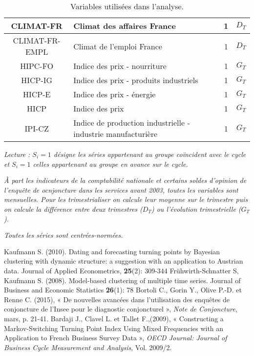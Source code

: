 \documentclass[10pt,french,french]{article}
\begin{document}
\begin{table}[h]
{\begin{tabular}{ | c | p{10cm} | c|c|}
     CLIMAT-FR & Climat des affaires France & 1 & $D_T$\\ \hline
     CLIMAT-FR-EMPL & Climat de l'emploi France  & 1 & $D_T$\\ \hline
     HIPC-FO & Indice des prix - nourriture & 1 & $G_T$\\ \hline
     HICP-IG & Indice des prix - produits industriels & 1 & $G_T$\\ \hline
     HICP-E & Indice des prix - énergie & 1 & $G_T$\\ \hline
     HICP & Indice des prix & 1 & $G_T$\\ \hline
     IPI-CZ & Indice de production industrielle - industrie manufacturière & 1& $G_T$ \\
     \hline
   \end{tabular}
   \caption{Variables utilisées dans l'analyse.}\label{tableau_var}}
  \footnotesize
\emph{Lecture : $S_i=1$ désigne les séries appartenant au groupe coïncident avec le cycle et $S_i=1$ celles appartenant au groupe en avance sur le cycle.}

\emph{À part les indicateurs de la comptabilité nationale et certains soldes d'opinion de l'enquête de ocnjoncture dans les services avant 2003, toutes les variables sont mensuelles. Pour les trimestrialiser on calcule leur moyenne sur le trimestre puis on calcule la différence entre deux trimestres ($D_T$) ou l'évolution trimestrielle ($G_T$).}

\emph{Toutes les séries sont centrées-normées.}
\end{table}

\newpage

\nocite{*}

\begin{thebibliography}{999}
 Kaufmann S. (2010). Dating and forecasting turning points by Bayesian clustering with dynamic structure: a suggestion with an application to Austrian data. Journal of Applied Econometrics, \textbf{25}(2): 309-344 
 Frühwirth-Schnatter S, Kaufmann S. (2008). Model-based clustering of multiple time series. Journal of Business and Economic Statistics \textbf{26}(1): 78
 Bortoli C., Gorin Y., Olive P.-D. et Renne C. (2015), « De nouvelles avancées dans l’utilisation des enquêtes de conjoncture de l’Insee pour le diagnostic conjoncturel », \emph{Note de Conjoncture}, mars, p. 21-41.
 Bardaji J., Clavel L. et Tallet F.,(2009), « Constructing a Markov-Switching Turning Point Index Using Mixed Frequencies with an Application to French Business Survey Data », \emph{OECD Journal: Journal of Business Cycle Measurement and Analysis}, Vol. 2009/2.
\end{thebibliography}
\end{document}
